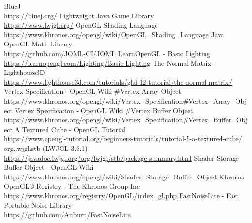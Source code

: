\documentclass{article}
\begin{document}
    \newpage
    
    \begin{thebibliography}{9}
        
        BlueJ \\
        \url{https://bluej.org/}
        Lightweight Java Game Library \\
        \url{https://www.lwjgl.org/}
        OpenGL Shading Language \\
        \url{https://www.khronos.org/opengl/wiki/OpenGL_Shading_Language}
        Java OpenGL Math Library \\
        \url{https://github.com/JOML-CI/JOML}
        LearnOpenGL - Basic Lighting \\
        \url{https://learnopengl.com/Lighting/Basic-Lighting}
        The Normal Matrix - Lighthouse3D \\
        \url{https://www.lighthouse3d.com/tutorials/glsl-12-tutorial/the-normal-matrix/}
        Vertex Specification - OpenGL Wiki \#Vertex Array Object \\
        \url{https://www.khronos.org/opengl/wiki/Vertex_Specification#Vertex_Array_Object}
        Vertex Specification - OpenGL Wiki \#Vertex Buffer Object \\
        \url{https://www.khronos.org/opengl/wiki/Vertex_Specification#Vertex_Buffer_Object}
        A Textured Cube - OpenGL Tutorial \\
        \url{https://www.opengl-tutorial.org/beginners-tutorials/tutorial-5-a-textured-cube/}
        org.lwjgl.stb (LWJGL 3.3.1) \\
        \url{https://javadoc.lwjgl.org/org/lwjgl/stb/package-summary.html}
        Shader Storage Buffer Object - OpenGL Wiki \\
        \url{https://www.khronos.org/opengl/wiki/Shader_Storage_Buffer_Object}
        Khronos OpenGL® Registry - The Khronos Group Inc \\
        \url{https://www.khronos.org/registry/OpenGL/index_gl.php}
        FastNoiseLite - Fast Portable Noise Library \\
        \url{https://github.com/Auburn/FastNoiseLite}


\end{thebibliography}
\end{document}
